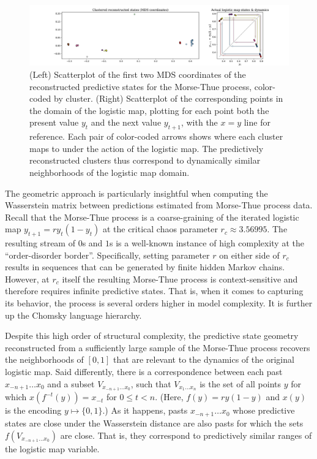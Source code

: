 \documentclass[sigconf, anonymous, review]{acmart}
\begin{document}
\begin{figure}[h]
\centering
\includegraphics[width=\linewidth]{../plots/feig_MDS.pdf}
\caption{(Left) Scatterplot of the first two MDS coordinates of the
	reconstructed predictive states for the Morse-Thue process, color-coded by
	cluster. (Right) Scatterplot of the corresponding points in the domain of
	the logistic map, plotting for each point both the present value $y_t$ and
	the next value $y_{t+1}$, with the $x=y$ line for reference. Each pair of
	color-coded arrows shows where each cluster maps to under the action of the
	logistic map. The predictively reconstructed clusters thus correspond to
	dynamically similar neighborhoods of the logistic map domain.
	}
\label{fig:mds-feig}
\end{figure}

The geometric approach is particularly insightful when computing the
Wasserstein matrix between predictions estimated from Morse-Thue process data.
Recall that the Morse-Thue process is a coarse-graining of the iterated
logistic map $y_{t+1} = ry_t(1-y_t)$ at the critical chaos parameter $r_c
\approx 3.56995$. The resulting stream of $0$s and $1$s is a well-known
instance of high complexity at the ``order-disorder border''. Specifically,
setting parameter $r$ on either side of $r_c$ results in sequences that
can be generated by finite hidden Markov chains. However, at $r_c$ itself the
resulting Morse-Thue process is context-sensitive and therefore requires
infinite predictive states. That is, when it comes to capturing its behavior,
the process is several orders higher in model complexity. It is further up the
Chomsky language hierarchy.

Despite this high order of structural complexity, the predictive state geometry
reconstructed from a sufficiently large sample of the Morse-Thue process
recovers the neighborhoods of $[0,1]$ that are relevant to the dynamics of the
original logistic map. Said differently, there is a correspondence between each
past $x_{-n+1}\dots x_{0}$ and a subset $V_{x_{-n+1}\dots x_{0}}$, such that
$V_{x_1\dots x_n}$ is the set of all points $y$ for which $x(f^{-t}(y)) =
x_{-t}$ for $0\leq t < n$. (Here, $f(y) = ry(1-y)$ and $x(y)$ is the encoding
$y\mapsto \{0,1\}$.) As it happens, pasts $x_{-n+1}\dots x_{0}$ whose predictive
states are close under the Wasserstein distance are also pasts for which the
sets $f(V_{x_{-n+1}\dots x_{0}})$ are close. That is, they correspond to
predictively similar ranges of the logistic map variable. 
\end{document}
